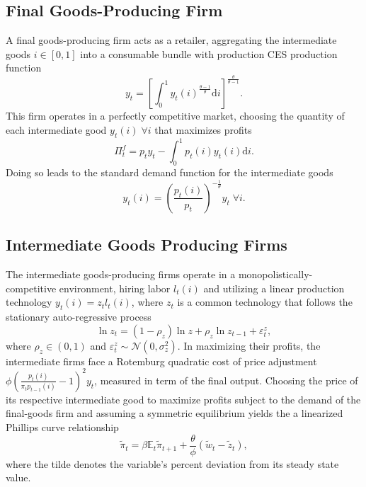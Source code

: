 \documentclass[11pt,a4paper,margin=1.5in]{article}
\begin{document}
\subsection{Final Goods-Producing Firm}
A final goods-producing firm acts as a retailer, aggregating the intermediate goods $i\in[0,1]$ into a consumable bundle with production CES production function
\begin{equation}
\label{eq:FinalGoods_Production}
	y_t = \left[\int^1_0 y_t(i)^{\frac{\theta-1}{\theta}}\mathrm{d}i\right]^\frac{\theta}{\theta-1}.
\end{equation}
This firm operates in a perfectly competitive market, choosing the quantity of each intermediate good $y_t(i)\; \forall i$ that maximizes profits
\begin{equation}
\label{eq:FinalGoods_Profit}
	\Pi_t^f = p_ty_t - \int_0^1p_t(i)y_t(i)\mathrm{d}i.
\end{equation}
Doing so leads to the standard demand function for the intermediate goods
\begin{equation}
\label{eq:FinalGoods_FOC}
	y_t(i) = \left(\frac{p_t(i)}{p_t}\right)^{-\frac{1}{\theta}}y_t \; \forall i.
\end{equation}

\subsection{Intermediate Goods Producing Firms}
The intermediate goods-producing firms operate in a monopolistically-competitive environment, hiring labor $l_t(i)$ and utilizing a linear production technology $y_t(i) = z_tl_t(i)$, where $z_t$ is a common technology that follows the stationary auto-regressive process
\begin{equation}
\label{eq:Technology}
	\ln z_t = (1-\rho_z)\ln z + \rho_z \ln z_{t-1} + \varepsilon^z_t,
\end{equation}
where $\rho_z \in (0,1)$ and $\varepsilon^z_t \sim \mathcal{N}(0,\sigma^2_z)$.
In maximizing their profits, the intermediate firms face a Rotemburg quadratic cost of price adjustment $\phi\left(\frac{p_t(i)}{\pi_t p_{t-1}(i)} - 1\right)^2y_t$, measured in term of the final output.
Choosing the price of its respective intermediate good to maximize profits subject to the demand of the final-goods firm and assuming a symmetric equilibrium yields the a linearized Phillips curve relationship
\begin{equation}
\label{eq:NKPC}
	\tilde{\pi}_t = \beta\mathbb{E}_t\tilde{\pi}_{t+1} + \frac{\theta}{\phi}(\tilde{w}_t - \tilde{z}_t),
\end{equation}
where the tilde denotes the variable's percent deviation from its steady state value.
\end{document}
